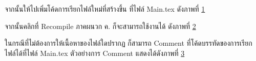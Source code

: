 \begin{mycustomenum2}
    \item จากนั้นให้ไปเพิ่มโค้ดการเรียกไฟล์ใหม่ที่สร้างขึ้น ที่ไฟล์ Main.tex ดังภาพที่ \ref{figB:CreateFile3}

\begin{figure}[htbp]
\centering
{}
\caption{}
\label{figB:CreateFile3}
\end{figure}

    \item จากนั้นคลิกที่ Recompile ภาคผนวก ค. ก็จะสามารถใช้งานได้ ดังภาพที่ \ref{figB:CreateFile4}

\begin{figure}[htbp]
\centering
{}
\caption{}
\label{figB:CreateFile4}
\end{figure}

    \item ในกรณีที่ไม่ต้องการให้เนื้อหาของไฟล์ใดปรากฏ ก็สามารถ Comment ที่โค้ดบรรทัดของการเรียกไฟล์ได้ที่ไฟล์ Main.tex ตัวอย่างการ Comment แสดงได้ดังภาพที่ \ref{figB:CreateFile5} 

\begin{figure}[htbp]
\centering
{}
\caption{}
\label{figB:CreateFile5}
\end{figure}

\end{mycustomenum2}